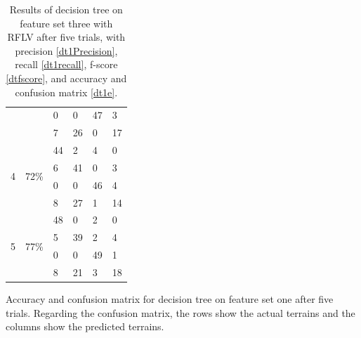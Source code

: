\documentclass[USenglish]{ifimaster}  %
\begin{document}
\begin{table}[h]
\begin{subtable}[h]{1\textwidth}
\begin{tabular}{@{}llllll@{}}
		\multicolumn{1}{l|}{} & \multicolumn{1}{l|}{} & \multicolumn{1}{l|}{0} & \multicolumn{1}{l|}{0} & \multicolumn{1}{l|}{47} & 3 \\ \cmidrule(l){3-6} 
		\multicolumn{1}{l|}{} & \multicolumn{1}{l|}{} & \multicolumn{1}{l|}{7} & \multicolumn{1}{l|}{26} & \multicolumn{1}{l|}{0} & 17 \\ \midrule
		\multicolumn{1}{l|}{\multirow{4}{*}{4}} & \multicolumn{1}{l|}{\multirow{4}{*}{72\%}} & \multicolumn{1}{l|}{44} & \multicolumn{1}{l|}{2} & \multicolumn{1}{l|}{4} & 0 \\ \cmidrule(l){3-6} 
		\multicolumn{1}{l|}{} & \multicolumn{1}{l|}{} & \multicolumn{1}{l|}{6} & \multicolumn{1}{l|}{41} & \multicolumn{1}{l|}{0} & 3 \\ \cmidrule(l){3-6} 
		\multicolumn{1}{l|}{} & \multicolumn{1}{l|}{} & \multicolumn{1}{l|}{0} & \multicolumn{1}{l|}{0} & \multicolumn{1}{l|}{46} & 4 \\ \cmidrule(l){3-6} 
		\multicolumn{1}{l|}{} & \multicolumn{1}{l|}{} & \multicolumn{1}{l|}{8} & \multicolumn{1}{l|}{27} & \multicolumn{1}{l|}{1} & 14 \\ \midrule
		\multicolumn{1}{l|}{\multirow{4}{*}{5}} & \multicolumn{1}{l|}{\multirow{4}{*}{77\%}} & \multicolumn{1}{l|}{48} & \multicolumn{1}{l|}{0} & \multicolumn{1}{l|}{2} & 0 \\ \cmidrule(l){3-6} 
		\multicolumn{1}{l|}{} & \multicolumn{1}{l|}{} & \multicolumn{1}{l|}{5} & \multicolumn{1}{l|}{39} & \multicolumn{1}{l|}{2} & 4 \\ \cmidrule(l){3-6} 
		\multicolumn{1}{l|}{} & \multicolumn{1}{l|}{} & \multicolumn{1}{l|}{0} & \multicolumn{1}{l|}{0} & \multicolumn{1}{l|}{49} & 1 \\ \cmidrule(l){3-6} 
		\multicolumn{1}{l|}{} & \multicolumn{1}{l|}{} & \multicolumn{1}{l|}{8} & \multicolumn{1}{l|}{21} & \multicolumn{1}{l|}{3} & 18 \\ \bottomrule
	\end{tabular}
	\caption{Accuracy and confusion matrix for decision tree on feature set one after five trials. Regarding the confusion matrix, the rows show the actual terrains and the columns show the predicted terrains.}
	\label{dt1e}
	\end{subtable}
	\caption[Results of decision tree on feature set one with RFLV]{Results of decision tree on feature set three with RFLV after five trials, with precision \ref{dt1Precision}, recall \ref{dt1recall}, f-score \ref{dtfscore}, and accuracy and confusion matrix \ref{dt1e}.}
\label{tab:dt1e2}
\end{table}
\FloatBarrier
\newpage
\end{document}
